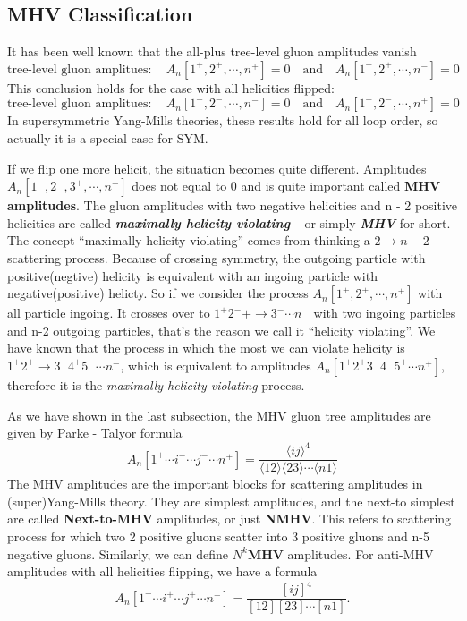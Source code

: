 \documentclass[12pt]{article}
\numberwithin{equation}{section}
\newcommand{\mdavg}[2]{\langle #1 \rangle\!\langle #2 \rangle}
\newcommand{\avg}[1]{\langle #1 \rangle}
\newcommand{\tif}[1]{\textit{\textbf{#1}}}
\begin{document}
\subsection{MHV Classification}
It has been well known that the all-plus tree-level gluon amplitudes vanish
\begin{equation}
    \text{tree-level gluon amplitues}: \quad A_n[1^+,2^+,\cdots,n^+]=0 \quad\text{and}\quad A_n[1^+,2^+,\cdots,n^-]=0
\end{equation}
This conclusion holds for the case with all helicities flipped:
\begin{equation}
    \text{tree-level gluon amplitues}: \quad A_n[1^-,2^-,\cdots,n^-]=0 \quad\text{and}\quad A_n[1^-,2^-,\cdots,n^+]=0
\end{equation}
In supersymmetric Yang-Mills theories, these results hold for all loop order, so actually it is a special case for SYM.

If we flip one more helicit, the situation becomes quite different. Amplitudes $A_n[1^-,2^-,3^+,\cdots,n^+]$ does not equal to 0 and is quite important called \textbf{MHV amplitudes}.
The gluon amplitudes with two negative helicities and n - 2 positive helicities are called
\tif{maximally helicity violating} – or simply \tif{MHV} for short. The concept ``maximally helicity violating'' comes from thinking a $2\rightarrow n-2$ scattering process. 
Because of crossing symmetry, the outgoing particle with positive(negtive) helicity is equivalent with an ingoing particle with negative(positive) helicty. So if we consider the process $A_n[1^+,2^+,\cdots,n^+]$ with 
all particle ingoing. It crosses over to $1^+2^-+\rightarrow 3^-\cdots n^-$ with two ingoing particles and n-2 outgoing particles, that's the reason we call it ``helicity violating''. We have known that the process in which the most we can violate helicity
is $1^+2^+\rightarrow 3^+4^+5^-\cdots n^-$, which is equivalent to amplitudes $A_n[1^+2^+3^-4^-5^+\cdots n^+]$, therefore it is the \textit{maximally helicity violating} process.

As we have shown in the last subsection, the MHV gluon tree amplitudes are given by Parke - Talyor formula
\begin{equation}
    A_n[1^+\cdots i^-\cdots j^- \cdots n^+]=\frac{\avg{ij}^4}{\mdavg{12}{23}\cdots\avg{n1}}
\end{equation}
The MHV amplitudes are the important blocks for scattering amplitudes in (super)Yang-Mills theory. They are simplest amplitudes, and the next-to simplest
are called \textbf{Next-to-MHV} amplitudes, or just \textbf{NMHV}. This refers to scattering process for which two 2 positive gluons scatter into 3 positive gluons and n-5 negative gluons. 
Similarly, we can define \textbf{$N^k$MHV} amplitudes. For anti-MHV amplitudes with all helicities flipping, we have a formula
\begin{equation}
    A_n[1^-\cdots i^+\cdots j^+ \cdots n^-]=\frac{[ij]^4}{[12][23]\cdots[n1]}.
\end{equation}
\end{document}
